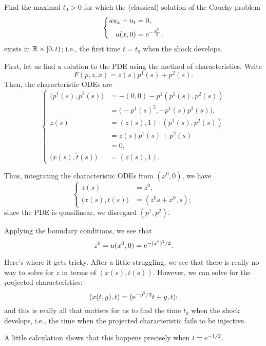 \begin{problem}
  Find the maximal \(t_0>0\) for which the (classical) solution of the
  Cauchy problem
  \[
    \left\{
      \begin{aligned}
        uu_x+u_t&=0,\\
        u(x,0)&=\mathrm{e}^{-\frac{x^2}{2}},
      \end{aligned}
    \right.
  \]
  exists in \(\mathbb{R}\times[0,t)\); i.e., the first time \(t=t_0\) when the
  shock develops.
\end{problem}
\begin{solution*}
  First, let us find a solution to the PDE using the method of
  characteristics. Write
  \[
    F(p,z,x)=z(s)p^1(s)+p^2(s).
  \]
  Then, the characteristic ODEs are
  \[
    \left\{
      \begin{aligned}
        \bigl(\dot p^1(s),\dot p^2(s)\bigr)
        &=-(0,0)-p^1(p^1(s),p^2(s))\\
        &=\bigl(-p^1(s)^2,-p^1(s)p^2(s)\bigr),\\
        \dot z(s)
        &=(z(s),1)\cdot(p^1(s),p^2(s))\\
        &=z(s)p^1(s)+p^2(s)\\
        &=0,\\
        \bigl(\dot x(s),\dot t(s)\bigr)
        &=(z(s),1).
      \end{aligned}
    \right.
  \]

  Thus, integrating the characteristic ODEs from \((x^0,0)\), we have
  \[
    \left\{
      \begin{aligned}
        \dot z(s)
        &=z^0,\\
        \bigl(x(s),t(s)\bigr)
        &=(z^0s+x^0,s);
      \end{aligned}
    \right.
  \]
  since the PDE is quasilinear, we disregard \((p^1,p^2)\).

  Applying the boundary conditions, we see that
  \[
    z^0=u(x^0,0)=\mathrm{e}^{-(x^0)^2/2}.
  \]

  Here's where it gets tricky. After a little struggling, we see that there
  is really no way to solve for \(z\) in terms of \((x(s),t(s))\). However,
  we can solve for the projected characteristics:
  \[
    (x(t,y),t)=(\mathrm{e}^{-y^2/2}t+y,t);
  \]
  and this is really all that matters for us to find the time \(t_0\)  when
  the shock develops, i.e., the time when the projected characteristic
  fails to be injective.

  A little calculation shows that this happens precisely when
  \(t=\mathrm{e}^{-1/2}\).
\end{solution*}

